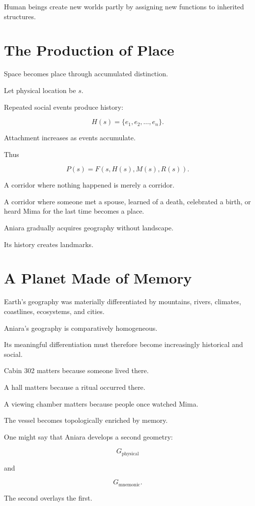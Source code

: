 \documentclass[11pt,oneside]{book}
\theoremstyle{definition}
\theoremstyle{remark}
\begin{document}
Human beings create new worlds partly by assigning new functions to inherited structures.

\section{The Production of Place}

Space becomes place through accumulated distinction.

Let physical location be \(s\).

Repeated social events produce history:

\[
H(s)
=
\{e_1,e_2,\ldots,e_n\}.
\]

Attachment increases as events accumulate.

Thus

\[
P(s)
=
F(s,H(s),M(s),R(s)).
\]

A corridor where nothing happened is merely a corridor.

A corridor where someone met a spouse, learned of a death, celebrated a birth, or heard Mima for the last time becomes a place.

Aniara gradually acquires geography without landscape.

Its history creates landmarks.

\section{A Planet Made of Memory}

Earth's geography was materially differentiated by mountains, rivers, climates, coastlines, ecosystems, and cities.

Aniara's geography is comparatively homogeneous.

Its meaningful differentiation must therefore become increasingly historical and social.

Cabin 302 matters because someone lived there.

A hall matters because a ritual occurred there.

A viewing chamber matters because people once watched Mima.

The vessel becomes topologically enriched by memory.

One might say that Aniara develops a second geometry:

\[
G_{\mathrm{physical}}
\]

and

\[
G_{\mathrm{mnemonic}}.
\]

The second overlays the first.
\end{document}
